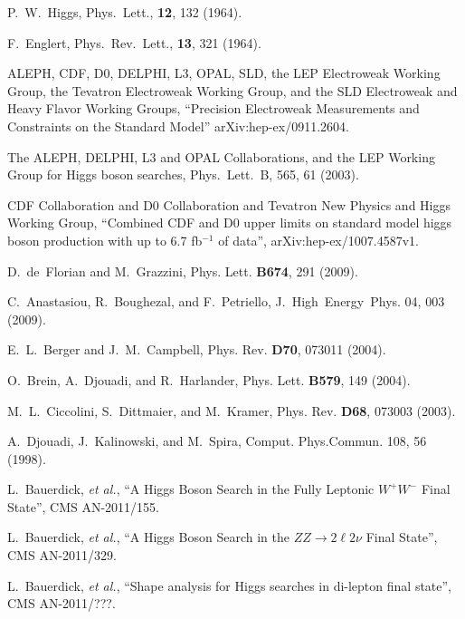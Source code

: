
\clearpage

\vspace*{-0.2cm}

 P.~W.~Higgs, Phys.~Lett., {\bf 12}, 132 (1964).

 F.~Englert, Phys.~Rev.~Lett., {\bf 13}, 321 (1964).

ALEPH, CDF, D0, DELPHI, L3, OPAL, SLD, the LEP Electroweak Working Group, 
the Tevatron Electroweak Working Group, and the SLD Electroweak and Heavy Flavor Working Groups, ``Precision Electroweak 
Measurements and Constraints on the Standard Model'' arXiv:hep-ex/0911.2604.

The ALEPH, DELPHI, L3 and OPAL Collaborations, and the LEP Working Group for Higgs boson searches,
Phys.~Lett.~B, 565, 61 (2003).

CDF Collaboration and D0 Collaboration and Tevatron New Physics and Higgs Working Group, 
``Combined CDF and D0 upper limits on standard model higgs boson production with up to 6.7 fb$^{-1}$ of data'', arXiv:hep-ex/1007.4587v1.

D.~de~Florian and M.~Grazzini, Phys. Lett. {\bf B674}, 291 (2009).

C.~Anastasiou, R.~Boughezal, and F.~Petriello, J.~High~Energy~Phys. 04, 003 (2009).

E.~L.~Berger and J.~M.~Campbell, Phys. Rev. {\bf D70}, 073011 (2004).

O.~Brein, A.~Djouadi, and R.~Harlander, Phys. Lett. {\bf B579}, 149 (2004).

M.~L.~Ciccolini, S.~Dittmaier, and M.~Kramer, Phys. Rev. {\bf D68}, 073003 (2003).

A.~Djouadi, J.~Kalinowski, and M.~Spira, Comput. Phys.Commun. 108, 56 (1998).

L.~Bauerdick, \textit{et al.}, ``A Higgs Boson Search in the Fully Leptonic $W^{+}W^{-}$ Final State'', CMS AN-2011/155.

L.~Bauerdick, \textit{et al.}, ``A Higgs Boson Search in the $ZZ \to 2\ell2\nu$ Final State'', CMS AN-2011/329.

L.~Bauerdick, \textit{et al.}, ``Shape analysis for Higgs searches in di-lepton final state'', CMS AN-2011/???.

